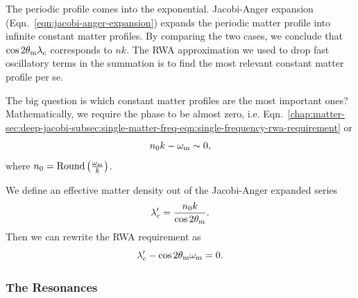 
The periodic profile comes into the exponential. Jacobi-Anger expansion (Eqn.~\ref{eqn:jacobi-anger-expansion}) expands the periodic matter profile into infinite constant matter profiles. By comparing the two cases, we conclude that $\cos 2\theta_\mathrm m\lambda_c$ corresponds to $nk$. The RWA approximation we used to drop fast oscillatory terms in the summation is to find the most relevant constant matter profile per se.

The big question is which constant matter profiles are the most important ones? Mathematically, we require the phase to be almost zero, i.e. Eqn.~\ref{chap:matter-sec:deep-jacobi-subsec:single-matter-freq-eqn:single-frequency-rwa-requirement} or
\begin{equation}
   n_0 k - \omega_\mathrm m \sim 0 ,
\end{equation}
where $n_0=\mathrm{Round}\left( \frac{\omega_\mathrm m}{k} \right)$.


We define an effective matter density out of the Jacobi-Anger expanded series
\begin{equation}
   \lambda_c' = \frac{n_0 k}{\cos 2\theta_\mathrm m}.
\end{equation}
Then we can rewrite the RWA requirement as
\begin{equation}
   \lambda_c' - \cos 2\theta_\mathrm m \omega_\mathrm m = 0.
\end{equation}




\subsubsection{The Resonances}


